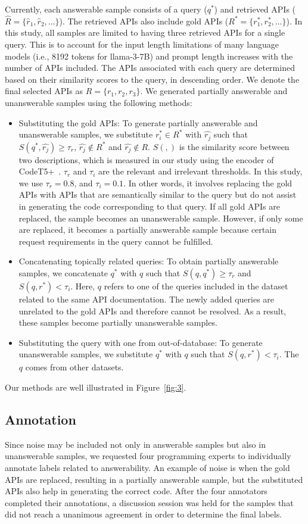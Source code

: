 Currently, each answerable sample consists of a query ($q^*$)
and retrieved APIs ($\hat{R}=\{\hat{r}_1,\hat{r}_2,...\}$). The retrieved APIs also include gold APIs ($R^*=\{r_1^*, r_2^*, ...\}$). In this study, all samples are limited to having three retrieved APIs for a single query. This is to account for the input length limitations of many language models (i.e., 8192 tokens for llama-3-7B) and prompt length increases with the number of APIs included. The APIs associated with each query are determined based on their similarity scores to the query, in descending order. We denote the final selected APIs as $R=\{r_1, r_2, r_3\}$. We generated partially answerable and unanswerable samples using the following methods:
\begin{itemize}
  \item Substituting the gold APIs: To generate partially answerable and unanswerable samples, we substitute $r_i^* \in R^*$ with $\hat{r_j}$ such that $S(q^*, \hat{r_j})\geq\tau_{r}$, $\hat{r_j} \notin R^*$ and $\hat{r_j} \notin R$. $S( , )$ is the similarity score between two descriptions, which is measured in our study using the encoder of CodeT5+~\cite{wang-etal-2023-codet5}. $\tau_{r}$ and $\tau_{i}$ are the relevant and irrelevant thresholds. In this study, we use $\tau_{r}=0.8$, and $\tau_{i}=0.1$. In other words, it involves replacing the gold APIs with APIs that are semantically similar to the query but do not assist in generating the code corresponding to that query. If all gold APIs are replaced, the sample becomes an unanswerable sample. However, if only some are replaced, it becomes a partially answerable sample because certain request requirements in the query cannot be fulfilled.
  \item Concatenating topically related queries: To obtain partially answerable samples, we concatenate $q^*$ with $q$ such that $S(q,q^*)\geq\tau_{r}$ and $S(q,r^*)<\tau_{i}$. Here, $q$ refers to one of the queries included in the dataset related to the same API documentation. The newly added queries are unrelated to the gold APIs and therefore cannot be resolved. As a result, these samples become partially unanswerable samples.   
  \item Substituting the query with one from out-of-database: To generate unanswerable samples, we substitute $q^*$ with $q$ such that $S(q,r^*) < \tau_{i}$. The $q$ comes from other datasets.
\end{itemize}
Our methods are well illustrated in Figure~\ref{fig:3}. 

\subsection{Annotation}
Since noise may be included not only in answerable samples but also in unanswerable samples, we requested four programming experts to individually annotate labels related to answerability. An example of noise is when the gold APIs are replaced, resulting in a partially answerable sample, but the substituted APIs also help in generating the correct code. After the four annotators completed their annotations, a discussion session was held for the samples that did not reach a unanimous agreement in order to determine the final labels.

